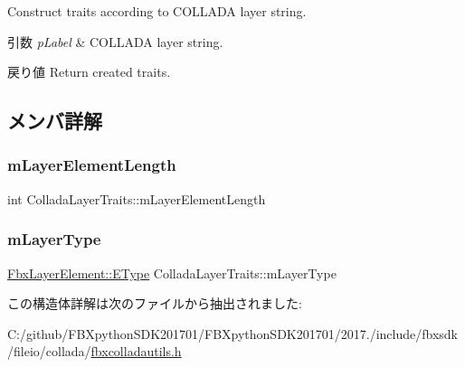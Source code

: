 Construct traits according to C\+O\+L\+L\+A\+DA layer string. 
\begin{DoxyParams}{引数}
{\em p\+Label} & C\+O\+L\+L\+A\+DA layer string. \\
\hline
\end{DoxyParams}
\begin{DoxyReturn}{戻り値}
Return created traits. 
\end{DoxyReturn}


\subsection{メンバ詳解}
\mbox{\label{struct_collada_layer_traits_a101229f9fd16ad7c7e751ad716008704}} 
\subsubsection{\texorpdfstring{m\+Layer\+Element\+Length}{mLayerElementLength}}
{\footnotesize\ttfamily int Collada\+Layer\+Traits\+::m\+Layer\+Element\+Length}

\mbox{\label{struct_collada_layer_traits_a3e6c41211a794e53cfc029a7c7093784}} 
\subsubsection{\texorpdfstring{m\+Layer\+Type}{mLayerType}}
{\footnotesize\ttfamily \hyperlink{class_fbx_layer_element_a8c95c5cd880b56c776acd379bd86f42c}{Fbx\+Layer\+Element\+::\+E\+Type} Collada\+Layer\+Traits\+::m\+Layer\+Type}



この構造体詳解は次のファイルから抽出されました\+:\begin{DoxyCompactItemize}
\item 
C\+:/github/\+F\+B\+Xpython\+S\+D\+K201701/\+F\+B\+Xpython\+S\+D\+K201701/2017./include/fbxsdk/fileio/collada/\hyperlink{fbxcolladautils_8h}{fbxcolladautils.\+h}\end{DoxyCompactItemize}

